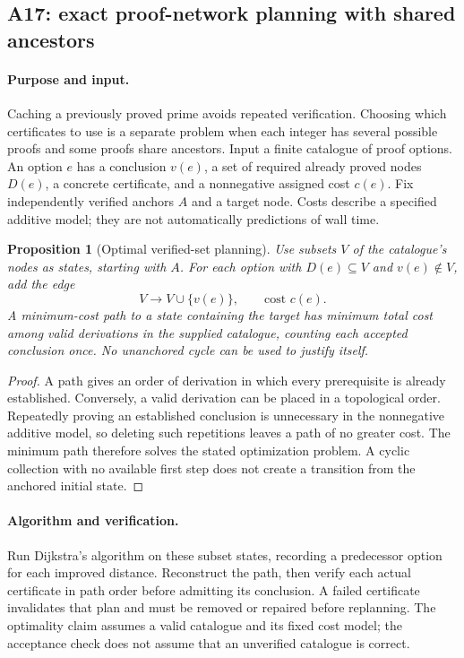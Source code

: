 \documentclass[11pt,a4paper]{article}
\newtheorem{proposition}[theorem]{Proposition}
\theoremstyle{definition}\newtheorem{definition}[theorem]{Definition}
\theoremstyle{remark}\newtheorem{remark}[theorem]{Remark}
\begin{document}
\subsection{A17: exact proof-network planning with shared ancestors}
\label{alg:A17}

\paragraph{Purpose and input.}
Caching a previously proved prime avoids repeated verification.  Choosing
which certificates to use is a separate problem when each integer has
several possible proofs and some proofs share ancestors.  Input a finite
catalogue of proof options.  An option $e$ has a conclusion $v(e)$, a set
of required already proved nodes $D(e)$, a concrete certificate, and a
nonnegative assigned cost $c(e)$.  Fix independently verified anchors
$A$ and a target node.  Costs describe a specified additive model; they
are not automatically predictions of wall time.

\begin{proposition}[Optimal verified-set planning]\label{prop:cert-plan}
Use subsets $V$ of the catalogue's nodes as states, starting with $A$.
For each option with $D(e)\subseteq V$ and $v(e)\notin V$, add the edge
\[
 V\longrightarrow V\cup\{v(e)\},\qquad\text{cost }c(e).
\]
A minimum-cost path to a state containing the target has minimum total
cost among valid derivations in the supplied catalogue, counting each
accepted conclusion once.  No unanchored cycle can be used to justify
itself.
\end{proposition}

\begin{proof}
A path gives an order of derivation in which every prerequisite is already
established.  Conversely, a valid derivation can be placed in a topological
order.  Repeatedly proving an established conclusion is unnecessary in the
nonnegative additive model, so deleting such repetitions leaves a path
of no greater cost.  The minimum path therefore solves the stated
optimization problem.  A cyclic collection with no available first step
does not create a transition from the anchored initial state.
\end{proof}

\paragraph{Algorithm and verification.}
Run Dijkstra's algorithm \cite{cert-dijkstra} on these subset states,
recording a predecessor option for each improved distance.  Reconstruct
the path, then verify each actual certificate in path order before
admitting its conclusion.  A failed certificate invalidates that plan
and must be removed or repaired before replanning.  The optimality claim
assumes a valid catalogue and its fixed cost model; the acceptance check
does not assume that an unverified catalogue is correct.
\end{document}
